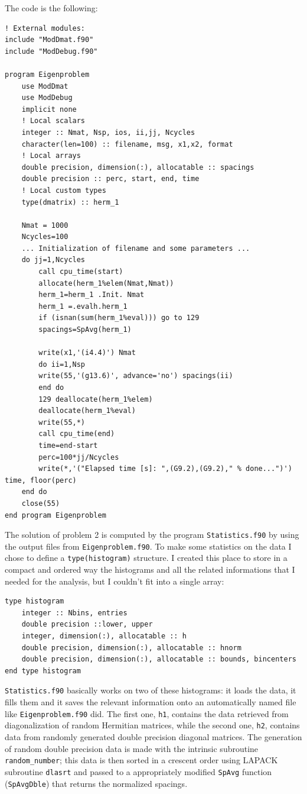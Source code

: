 \documentclass[a4paper]{article}
\begin{document}
The code is the following:
\begin{lstlisting}
! External modules:
include "ModDmat.f90"
include "ModDebug.f90"

program Eigenproblem
    use ModDmat
    use ModDebug
    implicit none
    ! Local scalars
    integer :: Nmat, Nsp, ios, ii,jj, Ncycles
    character(len=100) :: filename, msg, x1,x2, format
    ! Local arrays
    double precision, dimension(:), allocatable :: spacings
    double precision :: perc, start, end, time
    ! Local custom types
    type(dmatrix) :: herm_1

    Nmat = 1000
    Ncycles=100
    ... Initialization of filename and some parameters ...
    do jj=1,Ncycles
        call cpu_time(start)
        allocate(herm_1%elem(Nmat,Nmat))
        herm_1=herm_1 .Init. Nmat
        herm_1 =.evalh.herm_1
        if (isnan(sum(herm_1%eval))) go to 129
        spacings=SpAvg(herm_1)

        write(x1,'(i4.4)') Nmat
        do ii=1,Nsp
        write(55,'(g13.6)', advance='no') spacings(ii)
        end do
        129 deallocate(herm_1%elem)
        deallocate(herm_1%eval)
        write(55,*)
        call cpu_time(end)
        time=end-start
        perc=100*jj/Ncycles
        write(*,'("Elapsed time [s]: ",(G9.2),(G9.2)," % done...")') time, floor(perc)
    end do
    close(55)
end program Eigenproblem
\end{lstlisting}

The solution of problem 2 is computed by the program \lstinline{Statistics.f90} by using the output files from \lstinline{Eigenproblem.f90}.
To make some statistics on the data I chose to define a \lstinline{type(histogram)} structure.
I created this place to store in a compact and ordered way the histograms and all the related informations that I needed for the analysis, but I couldn't fit into a single array:
\begin{lstlisting}
type histogram
    integer :: Nbins, entries
    double precision ::lower, upper
    integer, dimension(:), allocatable :: h
    double precision, dimension(:), allocatable :: hnorm
    double precision, dimension(:), allocatable :: bounds, bincenters
end type histogram
\end{lstlisting}

\lstinline{Statistics.f90} basically works on two of these histograms: it loads the data, it fills them and it saves the relevant information onto an automatically named file like \lstinline{Eigenproblem.f90} did.
The first one, \lstinline{h1}, contains the data retrieved from diagonalization of random Hermitian matrices, while the second one, \lstinline{h2}, contains data from randomly generated double precision diagonal matrices.
The generation of random double precision data is made with the intrinsic subroutine \lstinline{random_number}; this data is then sorted in a crescent order using LAPACK subroutine \lstinline{dlasrt} and passed to a appropriately modified \lstinline{SpAvg} function (\lstinline{SpAvgDble}) that returns the normalized spacings.
\end{document}
